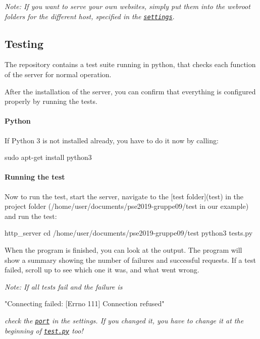 {\itshape Note\+: If you want to serve your own websites, simply put them into the webroot folders for the different host, specified in the \href{#paths}{\tt settings}}.

\subsection*{Testing}

The repository contains a test suite running in python, that checks each function of the server for normal operation.

After the installation of the server, you can confirm that everything is configured properly by running the tests.

\paragraph*{Python}

If Python 3 is not installed already, you have to do it now by calling\+: \begin{DoxyVerb}sudo apt-get install python3
\end{DoxyVerb}


\paragraph*{Running the test}

Now to run the test, start the server, navigate to the \mbox{[}test folder\mbox{]}(test) in the project folder (/home/user/documents/pse2019-\/gruppe09/test in our example) and run the test\+: \begin{DoxyVerb}http_server
cd /home/user/documents/pse2019-gruppe09/test
python3 tests.py
\end{DoxyVerb}


When the program is finished, you can look at the output. The program will show a summary showing the number of failures and successful requests. If a test failed, scroll up to see which one it was, and what went wrong.

{\itshape Note\+: If all tests fail and the failure is} \begin{DoxyVerb}"Connecting failed: [Errno 111] Connection refused"
\end{DoxyVerb}


{\itshape check the \href{#port}{\tt port} in the settings. If you changed it, you have to change it at the beginning of \href{test/tests.py}{\tt test.\+py} too!}

